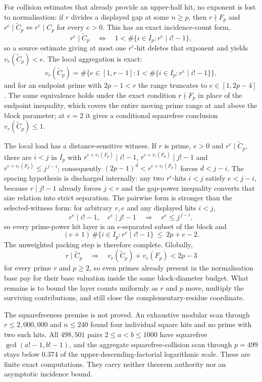 For collision estimates that already provide an upper-half hit, no exponent
is lost to normalisation: if $r$ divides a displayed gap at some $n\ge p$,
then $r\nmid F_p$ and $r^e\mid\widetilde C_p\iff r^e\mid C_p$ for every
$e>0$.  This has an exact incidence-count form,
\[
 r^e\mid\widetilde C_p
 \quad\Longleftrightarrow\quad
 1<\#\{i\in I_p:r^e\mid i!-1\},
\]
so a source estimate giving at most one $r^e$-hit deletes that exponent and
yields $v_r(\widetilde C_p)<e$.  The local aggregation is exact:
\[
 v_r(\widetilde C_p)=\#\bigl\{e\in[1,r-1]:1<\#\{i\in I_p:r^e\mid i!-1\}\bigr\},
\]
and for an endpoint prime with $2p-1<r$ the range truncates to
$e\in[1,2p-4]$.  The same equivalence holds under the exact condition
$r\nmid F_p$ in place of the endpoint inequality, which covers the entire
moving prime range at and above the block parameter; at $e=2$ it gives a
conditional squarefree conclusion $v_r(\widetilde C_p)\le1$.

The local load has a distance-sensitive witness.  If $r$ is prime, $e>0$ and
$r^e\mid\widetilde C_p$, there are $i<j$ in $I_p$ with
$r^{e+v_r(F_p)}\mid i!-1$, $r^{e+v_r(F_p)}\mid j!-1$ and
$r^{e+v_r(F_p)}\le j^{\,j-i}$; consequently $(2p-1)^d<r^{e+v_r(F_p)}$ forces
$d<j-i$.  The spacing hypothesis is discharged internally: any two $r^e$-hits
$i<j$ satisfy $e<j-i$, because $r\mid j!-1$ already forces $j<r$ and the
gap-power inequality converts that size relation into strict separation.  The
pairwise form is stronger than the selected-witness form: for arbitrary $r,e$
and any displayed hits $i<j$,
\[
 r^e\mid i!-1,\quad r^e\mid j!-1
 \quad\Longrightarrow\quad r^e\le j^{\,j-i},
\]
so every prime-power hit layer is an $e$-separated subset of the block and
\[
 (e+1)\,\#\{i\in I_p:r^e\mid i!-1\}\ \le\ 2p+e-2 .
\]
The unweighted packing step is therefore complete.  Globally,
\[
 r\mid\widetilde C_p
 \quad\Longrightarrow\quad
 v_r(\widetilde C_p)+v_r(F_p)<2p-3
\]
for every prime $r$ and $p\ge2$, so even primes already present in the
normalisation base pay for their base valuation inside the same
block-diameter budget.  What remains is to bound the layer counts uniformly
as $r$ and $p$ move, multiply the surviving contributions, and still close
the complementary-residue coordinate.

The squarefreeness premise is not proved.  An exhaustive modular scan through
$r\le2{,}000{,}000$ and $n\le240$ found four individual square hits and no
prime with two such hits.  All $498{,}501$ pairs $2\le a<b\le1000$ have
squarefree $\gcd(a!-1,b!-1)$, and the aggregate squarefree-collision scan
through $p=499$ stays below $0.374$ of the upper-descending-factorial
logarithmic scale.  These are finite exact computations.  They carry neither theorem authority
nor an asymptotic incidence bound.

